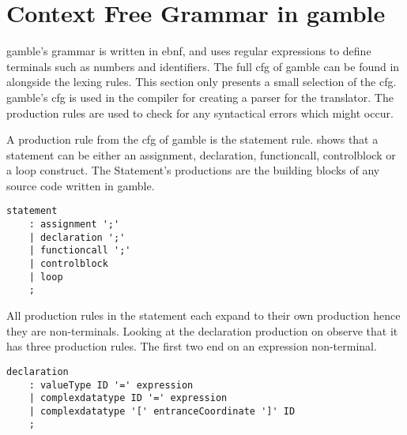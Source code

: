 \section{Context Free Grammar in \gls{gamble}}
\gls{gamble}'s grammar is written in \acrfull{ebnf}, and uses regular expressions to define terminals such as numbers and identifiers.
The full \acrshort{cfg} of \gls{gamble} can be found in  alongside the lexing rules.
This section only presents a small selection of the \acrshort{cfg}.
\gls{gamble}'s \acrshort{cfg} is used in the compiler for creating a parser for the translator.
The production rules are used to check for any syntactical errors which might occur.

A production rule from the \acrshort{cfg} of \gls{gamble} is the statement rule. 
 shows that a statement can be either an assignment, declaration, functioncall, controlblock or a loop construct. 
The Statement's productions are the building blocks of any source code written in \gls{gamble}.

\begin{lstlisting}[caption={\acrshort{cfg} for Statements in \gls{gamble}},frame=tlrb,label={lst:statements},numbers=none]
statement
    : assignment ';'
    | declaration ';'
    | functioncall ';'
    | controlblock 
    | loop
    ;
\end{lstlisting}

All production rules in the statement each expand to their own production hence they are non-terminals.
Looking at the declaration production on  observe that it has three production rules.
The first two end on an expression non-terminal.

\begin{lstlisting}[caption={\acrshort{cfg} for Declarations in \gls{gamble}},frame=tlrb,label={lst:declaration},numbers=none]
declaration                                           
    : valueType ID '=' expression                     
    | complexdatatype ID '=' expression               
    | complexdatatype '[' entranceCoordinate ']' ID   
    ; 
\end{lstlisting}

